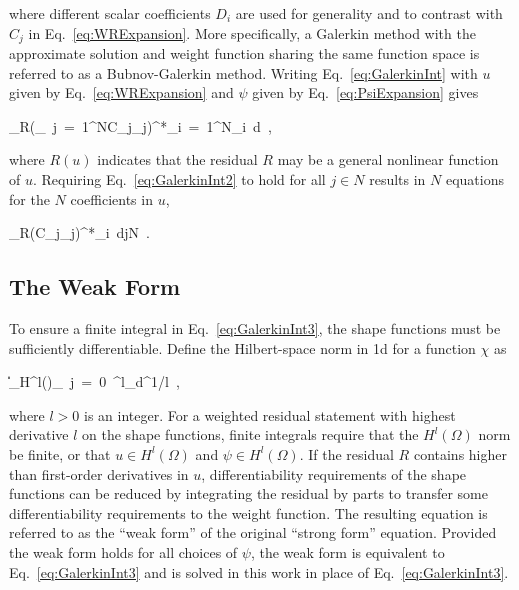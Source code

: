 \noindent where different scalar coefficients \(D_i\) are used for generality and to contrast with \(C_j\) in Eq.\ \eqref{eq:WRExpansion}. More specifically, a Galerkin method with the approximate solution and weight function sharing the same function space is referred to as a Bubnov-Galerkin method. Writing Eq.\ \eqref{eq:GalerkinInt} with \(u\) given by Eq.\ \eqref{eq:WRExpansion} and \(\psi\) given by Eq.\ \eqref{eq:PsiExpansion} gives

\beq
\label{eq:GalerkinInt2}
\bigintsss_{\Omega}\left\lbrack R\left(\sum_{\ j\ =\ 1}^NC_j\phi_j\right)\right\rbrack^*\sum_{i\ =\ 1}^N\phi_i\ d\ ,
\eeq

\noindent where \(R(u)\) indicates that the residual \(R\) may be a general nonlinear function of \(u\). Requiring Eq.\ \eqref{eq:GalerkinInt2} to hold for all \(j\in N\) results in \(N\) equations for the \(N\) coefficients in \(u\),

\beq
\label{eq:GalerkinInt3}
\int_{\Omega}\left\lbrack R\left(C_j\phi_j\right)\right\rbrack^*\phi_i\ d\hspace{1cm}j\in N\ .
\eeq

\subsection{The Weak Form}
\label{sec:weak_form}

To ensure a finite integral in Eq.\ \eqref{eq:GalerkinInt3}, the shape functions must be sufficiently differentiable. Define the Hilbert-space norm in \gls{1d} for a function \(\chi\) as

\beq
\label{eq:HilbertNorm}
\|\chi\|_{H^l(\Omega)}\equiv\left\lbrack\sum_{\ j\ =\ 0\ }^{l}\int_{\Omega}d\Omega\right\rbrack^{1/l}\ ,
\eeq

\noindent where \(l>0\) is an integer. For a weighted residual statement with highest derivative \(l\) on the shape functions, finite integrals require that the \(H^l(\Omega)\) norm be finite, or that \(u\in H^l(\Omega)\) and \(\psi\in H^l(\Omega)\). If the residual \(R\) contains higher than first-order derivatives in \(u\), differentiability requirements of the shape functions can be reduced by integrating the residual by parts to transfer some differentiability requirements to the weight function. The resulting equation is referred to as the ``weak form'' of the original ``strong form'' equation. Provided the weak form holds for all choices of \(\psi\), the weak form is equivalent to Eq.\ \eqref{eq:GalerkinInt3} and is solved in this work in place of Eq.\ \eqref{eq:GalerkinInt3}.

